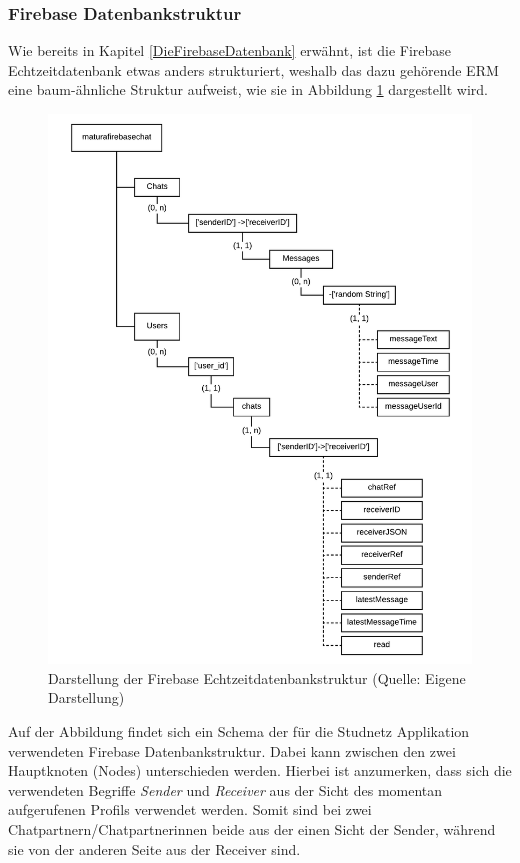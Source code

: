 \documentclass[../main.tex]{subfiles}
\begin{document}
	\subsubsection{Firebase Datenbankstruktur}
	Wie bereits in Kapitel \ref{DieFirebaseDatenbank} erwähnt, ist die Firebase Echtzeitdatenbank etwas anders strukturiert, weshalb das dazu gehörende ERM eine baum-ähnliche Struktur aufweist, wie sie in Abbildung \ref{firebaseTree} dargestellt wird. 
	\begin{figure} 
		\centering
		\includegraphics[width=\textwidth]{./images/FirebaseStructure.pdf}
		\caption{Darstellung der Firebase Echtzeitdatenbankstruktur (Quelle: Eigene Darstellung)}
		\label{firebaseTree}
	\end{figure}
	Auf der Abbildung findet sich ein Schema der für die Studnetz Applikation verwendeten Firebase Datenbankstruktur. Dabei kann zwischen den zwei Hauptknoten (Nodes) unterschieden werden. Hierbei ist anzumerken, dass sich die verwendeten Begriffe \emph{Sender} und \emph{Receiver} aus der Sicht des momentan aufgerufenen Profils verwendet werden. Somit sind bei zwei Chatpartnern/Chatpartnerinnen beide aus der einen Sicht der Sender, während sie von der anderen Seite aus der Receiver sind.
	
\end{document}
